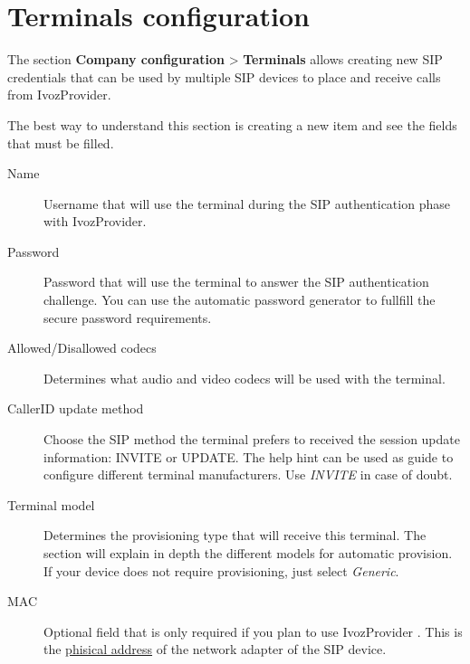 \documentclass[letterpaper,10pt,english]{sphinxmanual}
\begin{document}
\section{Terminals configuration}
\label{company/terminals:terminals}\label{company/terminals::doc}\label{company/terminals:terminals-configuration}
The section \textbf{Company configuration} \textgreater{} \textbf{Terminals} allows creating new
SIP credentials that can be used by multiple SIP devices to place and receive
calls from IvozProvider.

The best way to understand this section is creating a new item and see the
fields that must be filled.

\noindent{}
\begin{description}
\item[{Name}] \leavevmode{}\label{company/terminals:term-name}
Username that will use the terminal during the SIP authentication phase
with IvozProvider.

\item[{Password}] \leavevmode{}\label{company/terminals:term-password}
Password that will use the terminal to answer the SIP authentication
challenge. You can use the automatic password generator to fullfill the
secure password requirements.

\item[{Allowed/Disallowed codecs}] \leavevmode{}\label{company/terminals:term-allowed-disallowed-codecs}
Determines what audio and video codecs will be used with the terminal.

\item[{CallerID update method}] \leavevmode{}\label{company/terminals:term-callerid-update-method}
Choose the SIP method the terminal prefers to received the session
update information: INVITE or UPDATE. The help hint can be used as
guide to configure different terminal manufacturers. Use \emph{INVITE} in
case of doubt.

\item[{Terminal model}] \leavevmode{}\label{company/terminals:term-terminal-model}
Determines the provisioning type that will receive this terminal.
The section {\hyperref[platform/terminal_provisioning:provisioning]{}} will explain
in depth the different models for automatic provision. If your device
does not require provisioning, just select \emph{Generic}.

\item[{MAC}] \leavevmode{}\label{company/terminals:term-mac}
Optional field that is only required if you plan to use IvozProvider
{\hyperref[platform/terminal_provisioning:provisioning]{}}. This is the \href{https://wikipedia.org/wiki/MAC\_Address}{phisical
address} of the network
adapter of the SIP device.

\end{description}
\end{document}

